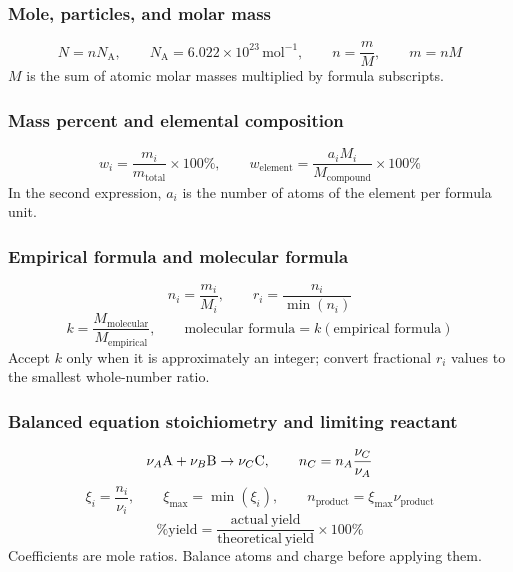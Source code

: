 \subsubsection{Mole, particles, and molar mass}
\begin{equation}\label{eq:atoms:mole-mass-particles}
N=nN_{\mathrm A}, \qquad N_{\mathrm A}=6.022\times10^{23}\,\mathrm{mol^{-1}}, \qquad n=\frac{m}{M}, \qquad m=nM
\end{equation}
\(M\) is the sum of atomic molar masses multiplied by formula subscripts.

\subsubsection{Mass percent and elemental composition}
\begin{equation}\label{eq:atoms:mass-percent}
w_i=\frac{m_i}{m_{\mathrm{total}}}\times100\%, \qquad
w_{\mathrm{element}}=\frac{a_iM_i}{M_{\mathrm{compound}}}\times100\%
\end{equation}
In the second expression, \(a_i\) is the number of atoms of the element per formula unit.

\subsubsection{Empirical formula and molecular formula}
\begin{equation}\label{eq:atoms:empirical-ratio}
n_i=\frac{m_i}{M_i}, \qquad r_i=\frac{n_i}{\min(n_i)}
\end{equation}
\begin{equation}\label{eq:atoms:molecular-factor}
k=\frac{M_{\mathrm{molecular}}}{M_{\mathrm{empirical}}}, \qquad
\text{molecular formula}=k\left(\text{empirical formula}\right)
\end{equation}
Accept \(k\) only when it is approximately an integer; convert fractional \(r_i\) values to the smallest whole-number ratio.

\subsubsection{Balanced equation stoichiometry and limiting reactant}
\begin{equation}\label{eq:atoms:stoichiometric-conversion}
\nu_A\ce{A}+\nu_B\ce{B}\rightarrow\nu_C\ce{C}, \qquad
n_C=n_A\frac{\nu_C}{\nu_A}
\end{equation}
\begin{equation}\label{eq:atoms:limiting-extent}
\xi_i=\frac{n_i}{\nu_i}, \qquad
\xi_{\max}=\min(\xi_i), \qquad
n_{\mathrm{product}}=\xi_{\max}\nu_{\mathrm{product}}
\end{equation}
\begin{equation}\label{eq:atoms:percent-yield}
\%\mathrm{yield}=\frac{\mathrm{actual\ yield}}{\mathrm{theoretical\ yield}}\times100\%
\end{equation}
Coefficients are mole ratios. Balance atoms and charge before applying them.

